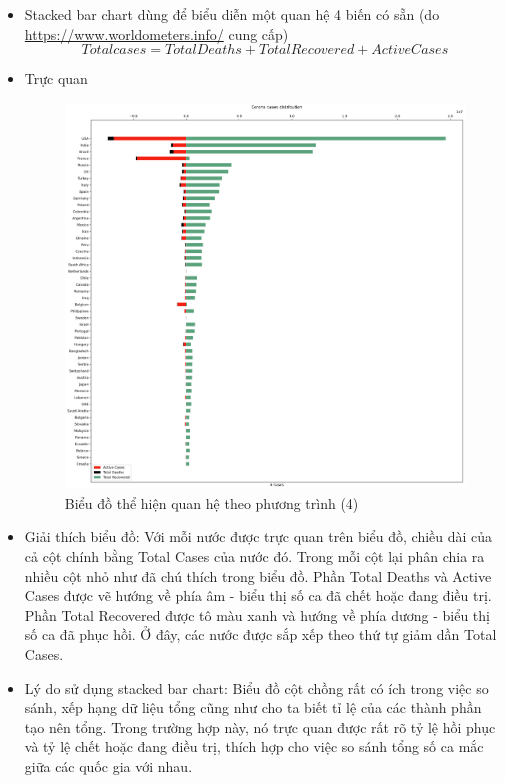\documentclass[a4paper, 12pt]{article}
\begin{document}
    \begin{itemize}
        \item Stacked bar chart dùng để biểu diễn một quan hệ 4 biến có sẵn (do \url{https://www.worldometers.info/} cung cấp)
        \begin{equation}
            Total cases = Total Deaths + Total Recovered + Active Cases
        \end{equation}

        \item Trực quan
        \begin{figure}[H]
            \begin{center}
                \includegraphics[scale=0.3]{img/stackedBar.png}
                \caption{Biểu đồ thể hiện quan hệ theo phương trình (4)}
            \end{center}
        \end{figure}

        \item Giải thích biểu đồ: Với mỗi nước được trực quan trên biểu đồ, chiều dài của cả cột chính bằng Total Cases của nước đó. Trong mỗi cột lại phân chia ra nhiều cột nhỏ như đã chú thích trong biểu đồ. Phần Total Deaths và Active Cases được vẽ hướng về phía âm - biểu thị số ca đã chết hoặc đang điều trị. Phần Total Recovered được tô màu xanh và hướng về phía dương - biểu thị số ca đã phục hồi. Ở đây, các nước được sắp xếp theo thứ tự giảm dần Total Cases.
        \item Lý do sử dụng stacked bar chart: Biểu đồ cột chồng rất có ích trong việc so sánh, xếp hạng dữ liệu tổng cũng như cho ta biết tỉ lệ của các thành phần tạo nên tổng. Trong trường hợp này, nó trực quan được rất rõ tỷ lệ hồi phục và tỷ lệ chết hoặc đang điều trị, thích hợp cho việc so sánh tổng số ca mắc giữa các quốc gia với nhau. 
    \end{itemize}
\end{document}
